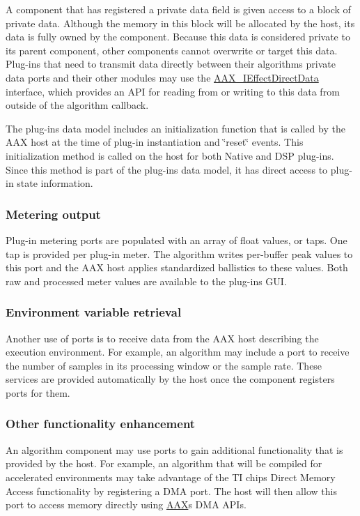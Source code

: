 A component that has registered a private data field is given access to a block of private data. Although the memory in this block will be allocated by the host, its data is fully owned by the component. Because this data is considered private to its parent component, other components cannot overwrite or target this data. Plug-\/ins that need to transmit data directly between their algorithms\textquotesingle{} private data ports and their other modules may use the \mbox{\hyperlink{a01817}{A\+A\+X\+\_\+\+I\+Effect\+Direct\+Data}} interface, which provides an A\+PI for reading from or writing to this data from outside of the algorithm callback.

The plug-\/in\textquotesingle{}s data model includes an initialization function that is called by the A\+AX host at the time of plug-\/in instantiation and \char`\"{}reset\char`\"{} events. This initialization method is called on the host for both Native and D\+SP plug-\/ins. Since this method is part of the plug-\/in\textquotesingle{}s data model, it has direct access to plug-\/in state information.

\hypertarget{a00797_subsection__metering_output}{}\subsubsection{Metering output}\label{a00797_subsection__metering_output}
Plug-\/in metering ports are populated with an array of float values, or \textquotesingle{}taps\textquotesingle{}. One tap is provided per plug-\/in meter. The algorithm writes per-\/buffer peak values to this port and the A\+AX host applies standardized ballistics to these values. Both raw and processed meter values are available to the plug-\/in\textquotesingle{}s G\+UI.

\hypertarget{a00797_subsection__environment_variable_retrieval}{}\subsubsection{Environment variable retrieval}\label{a00797_subsection__environment_variable_retrieval}
Another use of ports is to receive data from the A\+AX host describing the execution environment. For example, an algorithm may include a port to receive the number of samples in its processing window or the sample rate. These services are provided automatically by the host once the component registers ports for them.

\hypertarget{a00797_subsection__other_functionality_enhancement}{}\subsubsection{Other functionality enhancement}\label{a00797_subsection__other_functionality_enhancement}
An algorithm component may use ports to gain additional functionality that is provided by the host. For example, an algorithm that will be compiled for accelerated environments may take advantage of the TI chip\textquotesingle{}s Direct Memory Access functionality by registering a D\+MA port. The host will then allow this port to access memory directly using \mbox{\hyperlink{a00852}{A\+AX}}\textquotesingle{}s D\+MA A\+P\+Is.



